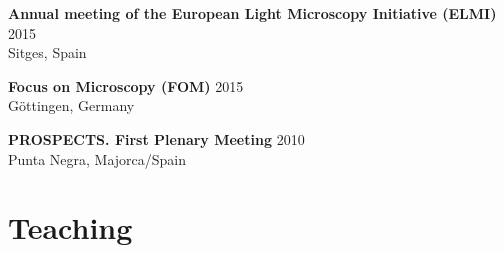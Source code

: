 \documentclass[margin,line]{res}
\begin{document}
\begin{resume}

\clearpage 

{\bf Annual meeting of the European Light Microscopy Initiative (ELMI)}  \hfill 2015\\
Sitges, Spain%

\vspace*{-3mm}
{\bf Focus on Microscopy (FOM)}  \hfill 2015\\
Göttingen, Germany

\vspace*{-3mm}
{\bf PROSPECTS. First Plenary Meeting}   \hfill 2010\\
Punta Negra, Majorca/Spain


\section{\sc Teaching}


\end{resume}
\end{document}

